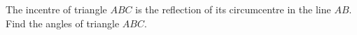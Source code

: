 The incentre of triangle $ABC$ is the reflection of its circumcentre in the line $AB$. Find the angles of triangle $ABC$.
